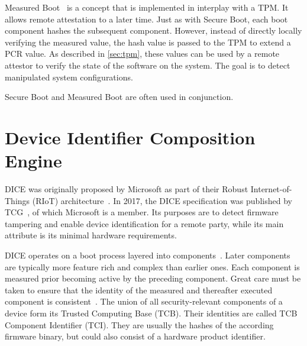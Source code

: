 Measured Boot~\cite{tcgMeasuredBoot} is a concept that is implemented in interplay with a TPM\@. It allows remote attestation to a later time. Just as with Secure Boot, each boot component hashes the subsequent component. However, instead of directly locally verifying the measured value, the hash value is passed to the TPM to extend a \ac{PCR} value. As described in \autoref{sec:tpm}, these values can be used by a remote attestor to verify the state of the software on the system. The goal is to detect manipulated system configurations.

Secure Boot and Measured Boot are often used in conjunction.

\section{Device Identifier Composition Engine}

\ac{DICE} was originally proposed by Microsoft as part of their Robust Internet-of-Things (RIoT) architecture~\cite{England2016}. In 2017, the DICE specification was published by \ac{TCG}~\cite{tcg-microsoft-tpm}, of which Microsoft is a member.
Its purposes are to detect firmware tampering and enable device identification for a remote party, while its main attribute is its minimal hardware requirements.


DICE operates on a boot process layered into components~\cite{dice-layering-arch}.
Later components are typically more feature rich and complex than earlier ones.
Each component is measured prior becoming active by the preceding component.
Great care must be taken to ensure that the identity of the measured and thereafter executed component is consistent~\cite{Hristozov2022, Carpent2018}.
The union of all security-relevant components of a device form its Trusted Computing Base (TCB).
Their identities are called TCB Component Identifier (TCI).
They are usually the hashes of the according firmware binary, but could also consist of a hardware product identifier.


